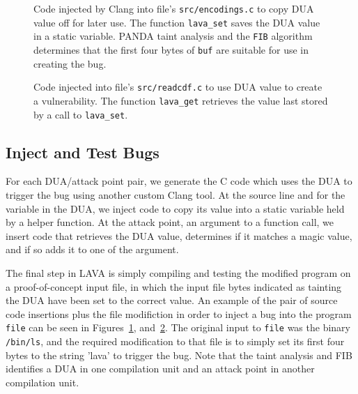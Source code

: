 \begin{figure}

\caption{Code injected by Clang into file's \texttt{src/encodings.c} to copy DUA value off for later use.
The function \texttt{lava\_set} saves the DUA value in a static variable.
PANDA taint analysis and the \texttt{FIB} algorithm determines that the first four bytes of \texttt{buf} are suitable for use in creating the bug.}
\label{src:dua-siphon}
\end{figure}

\begin{figure}

\caption{Code injected into file's \texttt{src/readcdf.c} to use DUA value to create a vulnerability.
The function \texttt{lava\_get} retrieves the value last stored by a call to  \texttt{lava\_set}.}
\label{src:dua-use}
\end{figure}

\subsection{Inject and Test Bugs}
For each DUA/attack point pair, we generate the C code which uses the DUA to trigger the bug using another custom Clang tool.
At the source line and for the variable in the DUA, we inject code to copy its value into a static variable held by a helper function.
At the attack point, an argument to a function call, we insert code that retrieves the DUA value, determines if it matches a magic value, and if so adds it to one of the argument.

The final step in LAVA is simply compiling and testing the modified program on a proof-of-concept input file, in which the input file bytes indicated as tainting the DUA have been set to the correct value.
An example of the pair of source code insertions plus the file modifiction in order to inject a bug into the program \verb+file+ can be seen in Figures~\ref{src:dua-siphon}, and~\ref{src:dua-use}.
The original input to \verb+file+ was the binary \verb+/bin/ls+, and the required modification to that file is to simply set its first four bytes to the string 'lava' to trigger the bug. 
Note that the taint analysis and FIB identifies a DUA in one compilation unit and an attack point in another compilation unit.  

